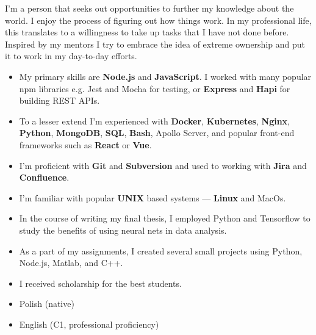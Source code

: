 I'm a person that seeks out opportunities to further my knowledge about the world.
I enjoy the process of figuring out how things work. In my professional life,
this translates to a willingness to take up tasks that I have not done before.
Inspired by my mentors I try to embrace the idea of extreme ownership and put it to work in my day-to-day efforts.

\begin{itemize}
\item My primary skills are \textbf{Node.js} and \textbf{JavaScript}. I worked with many popular npm libraries e.g. Jest and Mocha for testing, or \textbf{Express} and \textbf{Hapi} for building REST APIs.
\item To a lesser extend I’m experienced with \textbf{Docker}, \textbf{Kubernetes}, \textbf{Nginx}, \textbf{Python}, \textbf{MongoDB}, \textbf{SQL}, \textbf{Bash}, Apollo Server, and popular front-end frameworks such as \textbf{React} or \textbf{Vue}.
\item I’m proficient with \textbf{Git} and \textbf{Subversion} and used to working with \textbf{Jira} and \textbf{Confluence}.
\item I’m familiar with popular \textbf{UNIX} based systems — \textbf{Linux} and MacOs.
\end{itemize}

\begin{itemize}
    \item In the course of writing my final thesis, I employed Python and Tensorflow to study the benefits of using neural nets in data analysis.
    \item As a part of my assignments, I created several small projects using Python, Node.js, Matlab, and C++.
    \item I received scholarship for the best students.
\end{itemize}

\begin{itemize}
    \item Polish (native)
    \item English (C1, professional proficiency)
\end{itemize}
